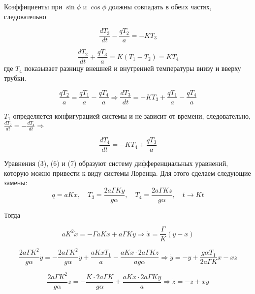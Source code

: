 \documentclass[12pt]{article}
\begin{document}
Коэффициенты при $\sin\phi$ и $\cos\phi$ должны совпадать в обеих частях, следовательно 

\begin{equation*}
\frac{dT_3}{dt} - \frac{qT_2}{a} = -KT_3
\end{equation*}

\begin{equation*}
\frac{dT_2}{dt} + \frac{qT_3}{a} = K(T_1-T_2) = KT_4
\end{equation*}
где $T_4$ показывает разницу внешней и внутренней температуры внизу и вверху трубки.

\begin{equation}\label{eq5}
\frac{qT_2}{a} = \frac{qT_1}{a} - \frac{qT_4}{a} \Longrightarrow \frac{dT_3}{dt} = -KT_3 + \frac{qT_1}{a} - \frac{qT_4}{a}
\end{equation}

$T_1$ определяется конфигурацией системы и не зависит от времени, следовательно, $\frac{dT_2}{dt} = -\frac{dT_4}{dt} \Longrightarrow$

\begin{equation}\label{eq6}
\frac{dT_4}{dt} = -KT_4 + \frac{qT_3}{a}
\end{equation}

Уравнения (3), (6) и (7) образуют систему дифференциальных уравнений, которую можно привести к виду системы Лоренца. Для этого сделаем следующие замены:
\begin{equation*}
q = aKx, \quad T_3 = \frac{2a \Gamma Ky}{g \alpha}, \quad T_4 = \frac{2a \Gamma Kz}{g \alpha}, \quad t \rightarrow Kt
\end{equation*}

Тогда

\begin{equation*}
aK^2\dot{x} = -\Gamma aKx + a\Gamma Ky \Longrightarrow \dot{x} = \frac{\Gamma}{K} (y - x)
\end{equation*}

\begin{equation*}
\frac{2a\Gamma K^2}{g\alpha} \dot{y} = -\frac{2a\Gamma K^2}{g\alpha}y + \frac{aKxT_1}{a} - \frac{aKx \cdot 2a \Gamma Kz}{ag\alpha} \Longrightarrow \dot{y} = -y + \frac{g\alpha T_1}{2a\Gamma K}x - xz
\end{equation*}

\begin{equation*}
\frac{2a\Gamma K^2}{g\alpha} \dot{z} = -\frac{K \cdot 2a\Gamma K}{g\alpha} + \frac{aKx \cdot 2a\Gamma Ky}{a} \Longrightarrow \dot{z} = -z+xy
\end{equation*}
\end{document}
